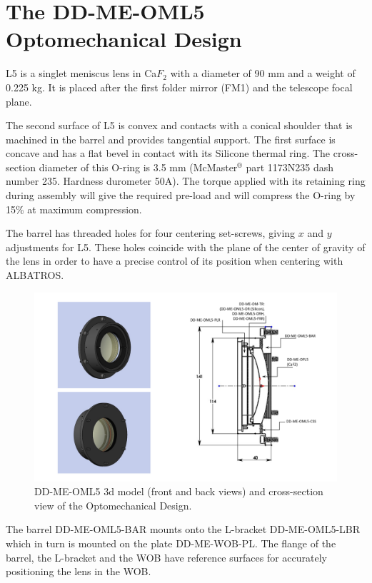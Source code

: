 \documentclass{report}
\begin{document}
\section{The DD-ME-OML5 Optomechanical Design}

L5 is a singlet meniscus lens in Ca$F_2$ with a diameter of 90 mm and a weight of 0.225 kg. It is placed after the first folder mirror (FM1) and the telescope focal plane. 

The second surface of L5 is convex and contacts with a conical shoulder that is machined in the barrel and provides tangential support. The first surface is concave and has a flat bevel in contact with its Silicone thermal ring. The cross-section diameter of this O-ring is 3.5 mm (McMaster${}^{\circledR}$ part 1173N235 dash number 235. Hardness durometer 50A). The torque applied with its retaining ring during assembly will give the required pre-load and will compress the O-ring by 15\% at maximum compression.

The barrel has threaded holes for four centering set-screws, giving $x$ and $y$ adjustments for L5. These holes coincide with the plane of the center of gravity of the lens in order to have a precise control of its position when centering with ALBATROS.

\begin{figure}
\begin{center}
\includegraphics[width=1.1\linewidth]{figures/DD-OML5.png}
\end{center}
\caption{DD-ME-OML5 3d model (front and back views) and cross-section view of the Optomechanical Design.}
\label{figure:WOB_OML5}
\end{figure}

The barrel DD-ME-OML5-BAR mounts onto the L-bracket DD-ME-OML5-LBR which in turn is mounted on the plate DD-ME-WOB-PL. The flange of the barrel, the L-bracket and the WOB have reference surfaces for accurately positioning the lens in the WOB. 
\end{document}
